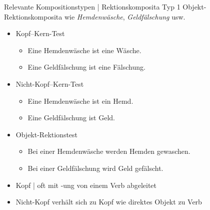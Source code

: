 \begin{frame}
  {Relevante Kompositionstypen | Rektionskomposita Typ 1}
  \onslide<+->
  Objekt-Rektionskomposita wie \textit{Hemdenwäsche}, \textit{Geldfälschung} usw.
  \Halbzeile
  \begin{itemize}[<+->]
    \item Kopf--Kern-Test
      \begin{itemize}[<+->]
        \item Eine Hemdenwäsche ist eine Wäsche. \gruen{\Ck}
        \item Eine Geldfälschung ist eine Fälschung. \gruen{\Ck}
      \end{itemize}
    \item Nicht-Kopf--Kern-Test
      \begin{itemize}[<+->]
        \item Eine Hemdenwäsche ist ein Hemd. \rot{\Fl}
        \item Eine Geldfälschung ist Geld. \rot{\Fl}
      \end{itemize}
      \Halbzeile
    \item Objekt-Rektionstest 
      \begin{itemize}[<+->]
        \item Bei einer Hemdenwäsche werden Hemden gewaschen. \gruen{\Ck}
        \item Bei einer Geldfälschung wird Geld gefälscht. \gruen{\Ck}
      \end{itemize}
      \Halbzeile
    \item Kopf | oft mit \alert{-ung} von einem Verb abgeleitet
    \item Nicht-Kopf verhält sich zu Kopf wie \alert{direktes Objekt} zu Verb
  \end{itemize}
\end{frame}


